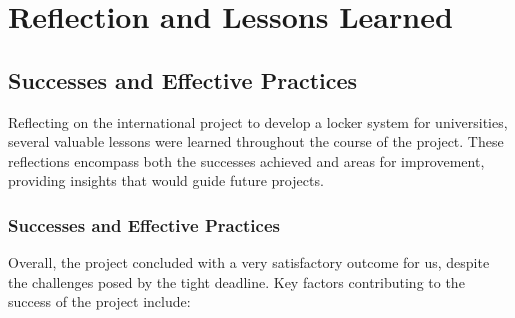 \section{Reflection and Lessons Learned}

\subsection{Successes and Effective Practices}

Reflecting on the international project to develop a locker system for universities, several valuable lessons were learned throughout the course of the project. These reflections encompass both the successes achieved and areas for improvement, providing insights that would guide future projects.

\subsubsection{Successes and Effective Practices}

Overall, the project concluded with a very satisfactory outcome for us, despite the challenges posed by the tight deadline. Key factors contributing to the success of the project include:

